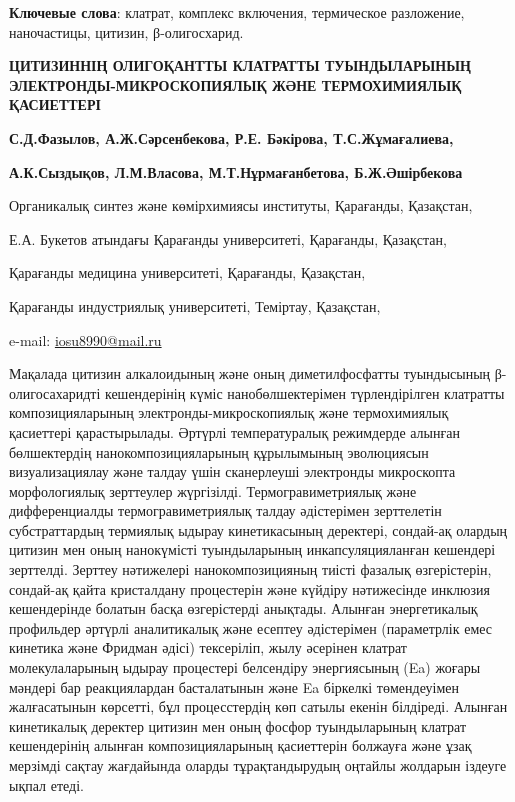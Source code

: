 {\bfseries Ключевые слова}: клатрат, комплекс включения, термическое
разложение, наночастицы, цитизин, β-олигосхарид.

{\bfseries ЦИТИЗИННІҢ ОЛИГОҚАНТТЫ КЛАТРАТТЫ ТУЫНДЫЛАРЫНЫҢ
ЭЛЕКТРОНДЫ-МИКРОСКОПИЯЛЫҚ ЖӘНЕ ТЕРМОХИМИЯЛЫҚ ҚАСИЕТТЕРІ}

{\bfseries {}С.Д.Фазылов\envelope ,
А.Ж.Сәрсенбекова, Р.Е. Бәкірова,
Т.С.Жұмағалиева,}

{\bfseries {}А.К.Сыздықов,
Л.М.Власова, М.Т.Нұрмағанбетова,
Б.Ж.Әшірбекова}

Органикалық синтез және көмірхимиясы институты,
Қарағанды, Қазақстан,

Е.А. Букетов атындағы Қарағанды университеті,
Қарағанды, Қазақстан,

Қарағанды медицина университеті, Қарағанды,
Қазақстан,

Қарағанды индустриялық университеті, Теміртау,
Қазақстан,

e-mail: \href{mailto:nurkenov_oral@mail.ru}{iosu8990@mail.ru}

Мақалада цитизин алкалоидының және оның диметилфосфатты туындысының
β-олигосахаридті кешендерінің күміс нанобөлшектерімен түрлендірілген
клатратты композицияларының электронды-микроскопиялық және термохимиялық
қасиеттері қарастырылады. Әртүрлі температуралық режимдерде алынған
бөлшектердің нанокомпозицияларының құрылымының эволюциясын
визуализациялау және талдау үшін сканерлеуші электронды микроскопта
морфологиялық зерттеулер жүргізілді. Термогравиметриялық және
дифференциалды термогравиметриялық талдау әдістерімен зерттелетін
субстраттардың термиялық ыдырау кинетикасының деректері, сондай-ақ
олардың цитизин мен оның нанокүмісті туындыларының инкапсуляцияланған
кешендері зерттелді. Зерттеу нәтижелері нанокомпозицияның тиісті фазалық
өзгерістерін, сондай-ақ қайта кристалдану процестерін және күйдіру
нәтижесінде инклюзия кешендерінде болатын басқа өзгерістерді анықтады.
Алынған энергетикалық профильдер әртүрлі аналитикалық және есептеу
әдістерімен (параметрлік емес кинетика және Фридман әдісі) тексеріліп,
жылу әсерінен клатрат молекулаларының ыдырау процестері белсендіру
энергиясының (Ea) жоғары мәндері бар реакциялардан басталатынын және Ea
біркелкі төмендеуімен жалғасатынын көрсетті, бұл процесстердің көп
сатылы екенін білдіреді. Алынған кинетикалық деректер цитизин мен оның
фосфор туындыларының клатрат кешендерінің алынған композицияларының
қасиеттерін болжауға және ұзақ мерзімді сақтау жағдайында оларды
тұрақтандырудың оңтайлы жолдарын іздеуге ықпал етеді.

